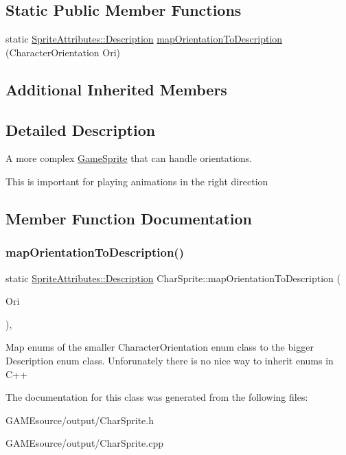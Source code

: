 \subsection*{Static Public Member Functions}
\begin{DoxyCompactItemize}
\item 
static \mbox{\hyperlink{namespace_sprite_attributes_a3ece96d6288b14d53d84e2138392395c}{Sprite\+Attributes\+::\+Description}} \mbox{\hyperlink{class_char_sprite_a7556b4b4123dbd51b13ec46fc11c0810}{map\+Orientation\+To\+Description}} (Character\+Orientation Ori)
\end{DoxyCompactItemize}
\subsection*{Additional Inherited Members}


\subsection{Detailed Description}
A more complex \mbox{\hyperlink{class_game_sprite}{Game\+Sprite}} that can handle orientations. 

This is important for playing animations in the right direction 

\subsection{Member Function Documentation}
\mbox{\label{class_char_sprite_a7556b4b4123dbd51b13ec46fc11c0810}} 
\subsubsection{\texorpdfstring{map\+Orientation\+To\+Description()}{mapOrientationToDescription()}}
{\footnotesize\ttfamily static \mbox{\hyperlink{namespace_sprite_attributes_a3ece96d6288b14d53d84e2138392395c}{Sprite\+Attributes\+::\+Description}} Char\+Sprite\+::map\+Orientation\+To\+Description (\begin{DoxyParamCaption}\item[{Character\+Orientation}]{Ori }\end{DoxyParamCaption})\hspace{0.3cm}{\ttfamily [inline]}, {\ttfamily [static]}}

Map enums of the smaller Character\+Orientation enum class to the bigger Description enum class. Unforunately there is no nice way to inherit enums in C++ 

The documentation for this class was generated from the following files\+:\begin{DoxyCompactItemize}
\item 
G\+A\+M\+Esource/output/Char\+Sprite.\+h\item 
G\+A\+M\+Esource/output/Char\+Sprite.\+cpp\end{DoxyCompactItemize}
